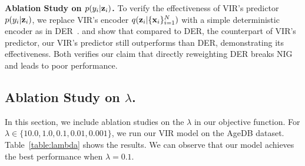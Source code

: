 %
\begin{wraptable}{R}{0.5\textwidth}
\vskip -0.6cm
\setlength{\tabcolsep}{1.5pt}
\caption{Ablation study for Uncertainty.}
\vspace{-1pt}
\label{table:agedb-var-ablation}
\small
\begin{center}
\end{center}
\vspace{-0.5cm}
\end{wraptable} %
%

\textbf{Ablation Study on {$p(y_i|{\bf z}_i)$}.} 
To verify the effectiveness of VIR's predictor $p(y_i|{\bf z}_i)$, we replace VIR's encoder $q({\bf z}_i|\{{\bf x}_i\}_{i=1}^N)$ with a simple deterministic encoder as in DER~\citep{DER}.  and  show that compared to DER, the counterpart of VIR's predictor, our VIR's predictor still outperforms than DER, demonstrating its effectiveness. Both verifies our claim that directly reweighting DER breaks NIG and leads to poor performance. 

\subsection{Ablation Study on \texorpdfstring{$\lambda$}{lambda}.}
{In this section, we include ablation studies on the $\lambda$ in our objective function. For $\lambda \in \{10.0, 1.0, 0.1, 0.01, 0.001 \}$, we run our VIR model on the AgeDB dataset. Table~\ref{table:lambda} shows the results. We can observe that our model achieves the best performance when $\lambda=0.1$.}

